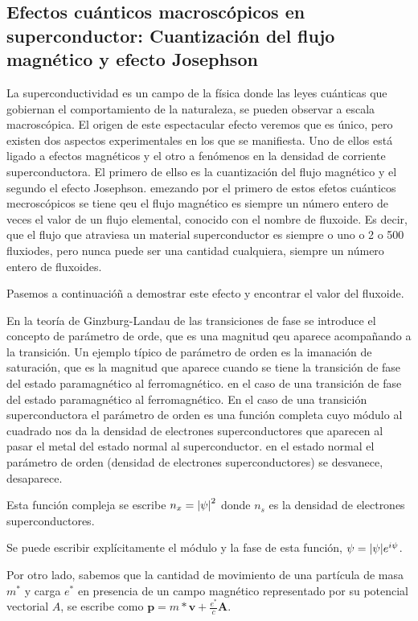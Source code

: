 \subsection{Efectos cuánticos macroscópicos en superconductor: Cuantización del flujo magnético y efecto Josephson}

La superconductividad es un campo de la física donde las leyes cuánticas que gobiernan el comportamiento de la naturaleza, se pueden observar a escala macroscópica. El origen de este espectacular efecto veremos que es único, pero existen dos aspectos experimentales en los que se manifiesta. Uno de ellos está ligado a efectos magnéticos y el otro a fenómenos en la densidad de corriente superconductora. El primero de ellso es la cuantización del flujo magnético y el segundo el efecto Josephson. emezando por el primero de estos efetos cuánticos mecroscópicos se tiene qeu el flujo magnético es siempre un número entero de veces el valor de un flujo elemental, conocido con el nombre de fluxoide. Es decir, que el flujo que atraviesa un material superconductor es siempre o uno o 2 o 500 fluxiodes, pero nunca puede ser una cantidad cualquiera, siempre un número entero de fluxoides.

Pasemos a continuacióñ a demostrar este efecto y encontrar el valor del fluxoide.

En la teoría de Ginzburg-Landau de las transiciones de fase se introduce el concepto de parámetro de orde, que es una magnitud qeu aparece acompañando a la transición. Un ejemplo típico de parámetro de orden es la imanación de saturación, que es la magnitud que aparece cuando se tiene la transición de fase del estado paramagnético al ferromagnético. en el caso de una transición de fase del estado paramagnético al ferromagnético. En el caso de una transición superconductora el parámetro de orden es una función completa cuyo módulo al cuadrado nos da la densidad de electrones superconductores que aparecen al pasar el metal del estado normal al superconductor. en el estado normal el parámetro de orden (densidad de electrones superconductores) se desvanece, desaparece.

Esta función compleja se escribe $n_x = \abs{\psi}^2$ donde $n_s$ es la densidad de electrones superconductores.

Se puede escribir explícitamente el módulo y la fase de esta función, $\psi = \abs{\psi} e^{i \psi}$.

Por otro lado, sabemos que la cantidad de movimiento de una partícula de masa $m^*$ y carga $e^*$ en presencia de un campo magnético representado por su potencial vectorial $A$, se escribe como $\mathbf{p} = m* \mathbf{v} + \frac{e^*}{c} \mathbf{A}$.


